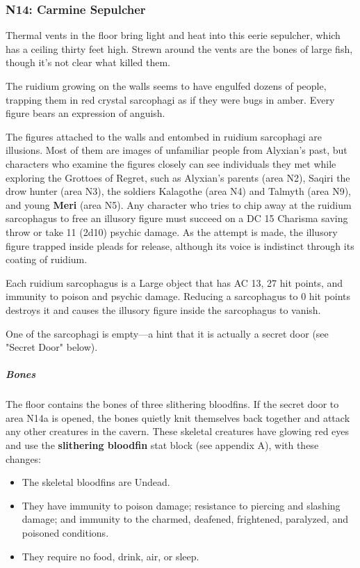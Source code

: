\documentclass[10pt,a4paper,twoside,bg=print,twocolumn,openany,nodeprecatedcode]{dndbook}
\begin{document}
\subsubsection{N14: Carmine Sepulcher}
\begin{DndReadAloud}{}
Thermal vents in the floor bring light and heat into this eerie sepulcher, which has a ceiling thirty feet high. Strewn around the vents are the bones of large fish, though it's not clear what killed them.

The ruidium growing on the walls seems to have engulfed dozens of people, trapping them in red crystal sarcophagi as if they were bugs in amber. Every figure bears an expression of anguish.

\end{DndReadAloud}

The figures attached to the walls and entombed in ruidium sarcophagi are illusions. Most of them are images of unfamiliar people from Alyxian's past, but characters who examine the figures closely can see individuals they met while exploring the Grottoes of Regret, such as Alyxian's parents (area N2), Saqiri the drow hunter (area N3), the soldiers Kalagothe (area N4) and Talmyth (area N9), and young \textbf{Meri} (area N5). Any character who tries to chip away at the ruidium sarcophagus to free an illusory figure must succeed on a DC 15 Charisma saving throw or take 11 (2d10) psychic damage. As the attempt is made, the illusory figure trapped inside pleads for release, although its voice is indistinct through its coating of ruidium.

Each ruidium sarcophagus is a Large object that has AC 13, 27 hit points, and immunity to poison and psychic damage. Reducing a sarcophagus to 0 hit points destroys it and causes the illusory figure inside the sarcophagus to vanish.

One of the sarcophagi is empty—a hint that it is actually a secret door (see "Secret Door" below).

\subparagraph{Bones}
The floor contains the bones of three slithering bloodfins. If the secret door to area N14a is opened, the bones quietly knit themselves back together and attack any other creatures in the cavern. These skeletal creatures have glowing red eyes and use the \textbf{slithering bloodfin} stat block (see appendix A), with these changes:


\begin{itemize}
\item The skeletal bloodfins are Undead.
\item They have immunity to poison damage; resistance to piercing and slashing damage; and immunity to the charmed, deafened, frightened, paralyzed, and poisoned conditions.
\item They require no food, drink, air, or sleep.
\end{itemize}
\end{document}
